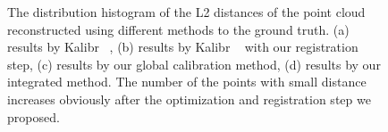 \documentclass{article}
\begin{document}
\begin{figure}[ht]
  \centering
{}%
\caption{The distribution histogram of the L2 distances of the point cloud reconstructed using different methods to the ground truth. (a) results by Kalibr ~\cite{Maye2013Self}, (b) results by Kalibr ~\cite{Maye2013Self} with our registration step, (c) results by our global calibration method, (d) results by our integrated method. The number of the points with small distance increases obviously after the optimization and registration step we proposed.}
\label{fig:histogram}
\end{figure}
\end{document}
